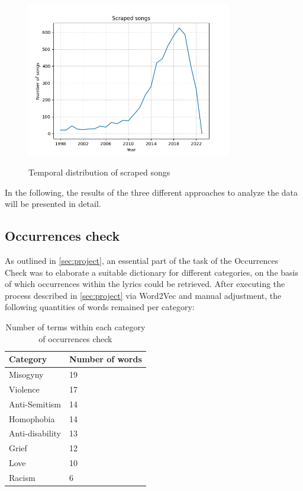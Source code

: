 \begin{figure}[!htb]
    \centering
    \includegraphics[width=0.8\textwidth]{figures/number_of_songs.png}
    \label{fig:number_songs}
    \caption{Temporal distribution of scraped songs}
\end{figure}

In the following, the results of the three different approaches to analyze the data will be presented in detail.

\subsection*{Occurrences check}

As outlined in \autoref*{sec:project}, an essential part of the task of the Occurrences Check was to elaborate a suitable dictionary for different categories, on the basis of which occurrences within the lyrics could be retrieved. After executing the process described in \autoref{sec:project} via Word2Vec and manual adjustment, the following quantities of words remained per category:

\def\arraystretch{1.2}
\begin{table}[!hbt]
    \centering
    \begin{tabular}{|l|l|}
    \hline
    \textbf{Category} & \textbf{Number of words} \\ \hline
    Misogyny        & 19 \\ \hline
    Violence        & 17 \\ \hline
    Anti-Semitism   & 14 \\ \hline
    Homophobia      & 14 \\ \hline
    Anti-disability & 13 \\ \hline
    Grief           & 12 \\ \hline
    Love            & 10 \\ \hline
    Racism          & 6  \\ \hline
    \end{tabular}
    \caption{Number of terms within each category of occurrences check}
    \label{tab:dictionary}
\end{table}


